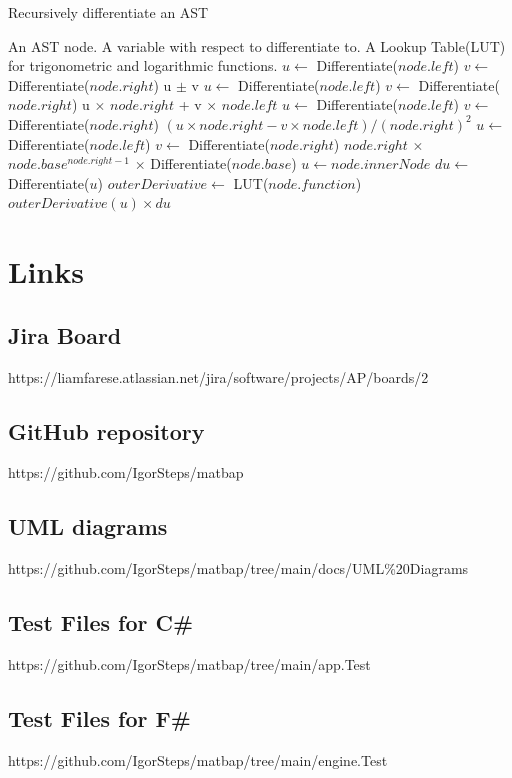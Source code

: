 \documentclass[a4paper, oneside, 11pt]{report}
\begin{document}
\begin{algorithm}
\begin{algorithmic}[1]
\caption{Recursively differentiate an AST}
\label{algorithm-differentiate}
\STATE An AST node.
\STATE A variable with respect to differentiate to.
\STATE A Lookup Table(LUT) for trigonometric and logarithmic functions.
        \STATE {}
        \STATE {}
        \STATE {}
            \STATE $u \gets$ {Differentiate}({$node.left$})
            \STATE $v \gets$ {Differentiate}({$node.right$})
            \STATE \RETURN u $\pm$ v
            \STATE $u \gets$ {Differentiate}({$node.left$})
            \STATE $v \gets$ {Differentiate}({$node.right$})
            \STATE \RETURN u $\times$ $node.right$ + v $\times$ $node.left$ 
            \STATE $u \gets$ {Differentiate}({$node.left$})
            \STATE $v \gets$ {Differentiate}({$node.right$})
            \STATE \RETURN $(u \times node.right - v \times node.left) / (node.right)^2$
            \STATE $u \gets$ {Differentiate}({$node.left$})
            \STATE $v \gets$ {Differentiate}({$node.right$})
            \STATE \RETURN $node.right$ $\times$ $node.base^{node.right-1}$ $\times$ {Differentiate}({$node.base$})
        \ENDIF
        \STATE $u \gets node.innerNode$
        \STATE $du \gets$ {Differentiate}({$u$})
        \STATE $outerDerivative \gets$ {LUT}({$node.function$})
        \STATE \RETURN $outerDerivative(u) \times du$
    \ENDIF
    
\end{algorithmic}
\end{algorithm}


\chapter{Links}
\label{app:links}
\section{Jira Board}
https://liamfarese.atlassian.net/jira/software/projects/AP/boards/2
\label{ap-jira-link}

\section{GitHub repository}
https://github.com/IgorSteps/matbap
\label{github-repo}

\section{UML diagrams}
https://github.com/IgorSteps/matbap/tree/main/docs/UML\%20Diagrams
\label{github-repo}

\section{Test Files for C\#}
https://github.com/IgorSteps/matbap/tree/main/app.Test
\section{Test Files for F\#}
https://github.com/IgorSteps/matbap/tree/main/engine.Test
\end{document}
